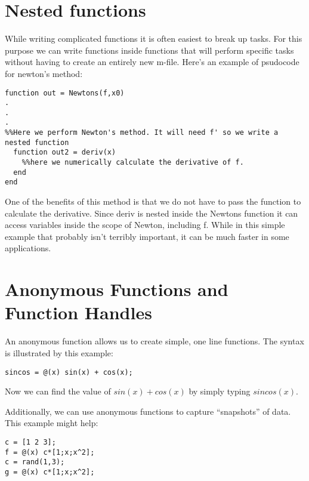 

\section*{Nested functions}

While writing complicated functions it is often easiest to break up tasks. For this purpose we can write functions inside functions that will perform specific tasks without having to create an entirely new m-file. Here's an example of psudocode for newton's method:

\begin{lstlisting}[style=matlab]
function out = Newtons(f,x0)
.
.
.
%%Here we perform Newton's method. It will need f' so we write a nested function
  function out2 = deriv(x)
    %%here we numerically calculate the derivative of f.
  end
end
\end{lstlisting}

One of the benefits of this method is that we do not have to pass the function to calculate the derivative. Since deriv is nested inside the Newtons function it can access variables inside the scope of Newton, including f. While in this simple example that probably isn't terribly important, it can be much faster in some applications.

\section*{Anonymous Functions and Function Handles}

An anonymous function allows us to create simple, one line functions. The syntax is illustrated by this example:

\begin{lstlisting}[style=matlab]
sincos = @(x) sin(x) + cos(x);
\end{lstlisting}

Now we can find the value of $sin(x) + cos(x)$ by simply typing $sincos(x)$.

Additionally, we can use anonymous functions to capture ``snapshots'' of data. This example might help:

\begin{lstlisting}[style=matlab]
c = [1 2 3];
f = @(x) c*[1;x;x^2];
c = rand(1,3);
g = @(x) c*[1;x;x^2];
\end{lstlisting}

